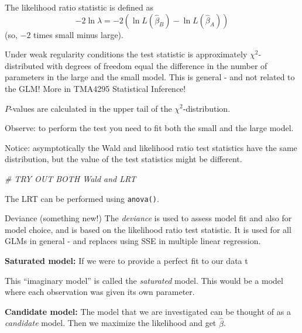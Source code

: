 \documentclass[
  ignorenonframetext,
]{beamer}
\newenvironment{Shaded}{\begin{snugshade}}{\end{snugshade}}
\newcommand{\CommentTok}[1]{\textcolor[rgb]{0.56,0.35,0.01}{\textit{#1}}}
\begin{document}
\begin{frame}{mm}
\label{mm-1}
The likelihood ratio statistic is defined as
\[- 2\ln \lambda=-2(\ln L(\hat{\beta}_B)-\ln L(\hat{\beta}_A)) \] (so,
\(-2\) times small minus large).

Under weak regularity conditions the test statistic is approximately
\(\chi^2\)-distributed with degrees of freedom equal the difference in
the number of parameters in the large and the small model. This is
general - and not related to the GLM! More in TMA4295 Statistical
Inference!

\(P\)-values are calculated in the upper tail of the
\(\chi^2\)-distribution.

Observe: to perform the test you need to fit both the small and the
large model.
\end{frame}

\begin{frame}[fragile]{mm}
\label{mm-2}
Notice: asymptotically the Wald and likelihood ratio test statistics
have the same distribution, but the value of the test statistics might
be different.

\begin{Shaded}
\begin{Highlighting}[]
\CommentTok{\# TRY OUT BOTH Wald and LRT}
\end{Highlighting}
\end{Shaded}

The LRT can be performed using \texttt{anova()}.
\end{frame}

\begin{frame}{Deviance (something new!)}
\label{deviance-something-new}
The \emph{deviance} is used to assess model fit and also for model
choice, and is based on the likelihood ratio test statistic. It is used
for all GLMs in general - and replaces using SSE in multiple linear
regression.

\textbf{Saturated model:} If we were to provide a perfect fit to our
data t

This ``imaginary model'' is called the \emph{saturated} model. This
would be a model where each observation was given its own parameter.

\textbf{Candidate model:} The model that we are investigated can be
thought of as a \emph{candidate} model. Then we maximize the likelihood
and get \(\hat{\beta}\).
\end{frame}
\end{document}
